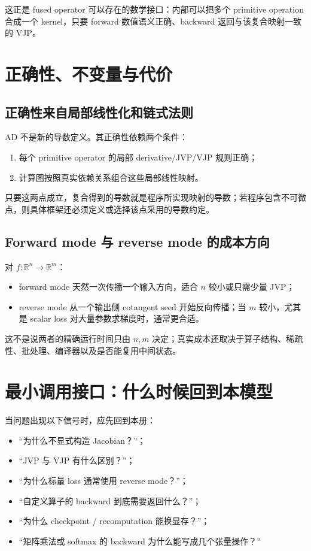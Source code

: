 \documentclass[profile=standard,twoside=false]{ipara-handbook}
\begin{document}
这正是 fused operator 可以存在的数学接口：内部可以把多个 primitive operation 合成一个 kernel，只要 forward 数值语义正确、backward 返回与该复合映射一致的 VJP。

\section{正确性、不变量与代价}

\subsection{正确性来自局部线性化和链式法则}

AD 不是新的导数定义。其正确性依赖两个条件：

\begin{enumerate}
  \item 每个 primitive operator 的局部 derivative/JVP/VJP 规则正确；
  \item 计算图按照真实依赖关系组合这些局部线性映射。
\end{enumerate}

只要这两点成立，复合得到的导数就是程序所实现映射的导数；若程序包含不可微点，则具体框架还必须定义或选择该点采用的导数约定。

\subsection{Forward mode 与 reverse mode 的成本方向}

对 $f:\mathbb{R}^{n}\to\mathbb{R}^{m}$：

\begin{itemize}
  \item forward mode 天然一次传播一个输入方向，适合 $n$ 较小或只需少量 JVP；
  \item reverse mode 从一个输出侧 cotangent seed 开始反向传播；当 $m$ 较小，尤其是 scalar loss 对大量参数求梯度时，通常更合适。
\end{itemize}

这不是说两者的精确运行时间只由 $n,m$ 决定；真实成本还取决于算子结构、稀疏性、批处理、编译器以及是否能复用中间状态。

\section{最小调用接口：什么时候回到本模型}

当问题出现以下信号时，应先回到本册：

\begin{itemize}
  \item “为什么不显式构造 Jacobian？”；
  \item “JVP 与 VJP 有什么区别？”；
  \item “为什么标量 loss 通常使用 reverse mode？”；
  \item “自定义算子的 backward 到底需要返回什么？”；
  \item “为什么 checkpoint / recomputation 能换显存？”；
  \item “矩阵乘法或 softmax 的 backward 为什么能写成几个张量操作？”
\end{itemize}
\end{document}
